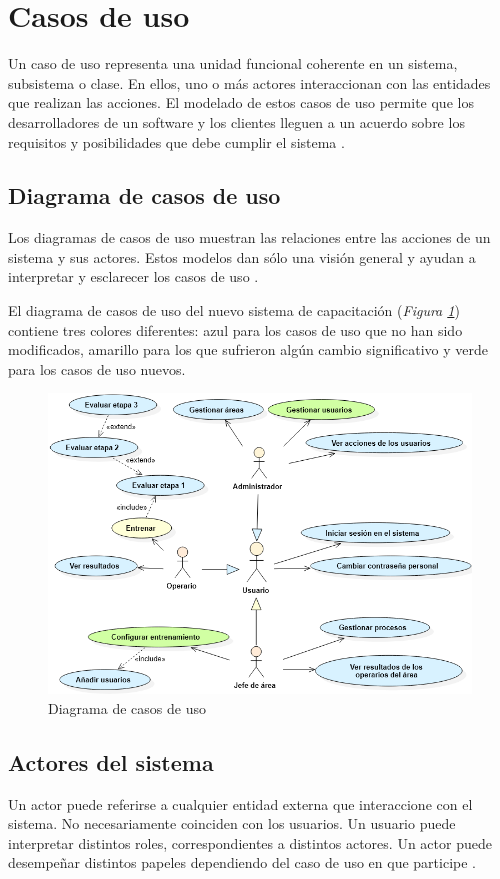 \section{Casos de uso}
Un caso de uso representa una unidad funcional coherente en un sistema, subsistema o clase. En ellos, uno o más actores interaccionan con las entidades que realizan las acciones. El modelado de estos casos de uso permite que los desarrolladores de un software y los clientes lleguen a un acuerdo sobre los requisitos y posibilidades que debe cumplir el sistema \cite{Kalaivani2004}.

\subsection{Diagrama de casos de uso}
Los diagramas de casos de uso muestran las relaciones entre las acciones de un sistema y sus actores. Estos modelos dan sólo una visión general y ayudan a interpretar y esclarecer los casos de uso \cite{Kalaivani2004}.

El diagrama de casos de uso del nuevo sistema de capacitación (\textsl{Figura \ref{fig:dcu}}) contiene tres colores diferentes: azul para los casos de uso que no han sido modificados, amarillo para los que sufrieron algún cambio significativo y verde para los casos de uso nuevos.

\begin{figure}[H]
\centering
 \includegraphics[width=0.65\linewidth]{imagen/dcu.png}
 \caption{Diagrama de casos de uso}
 \label{fig:dcu} 
\end{figure}

\subsection{Actores del sistema} 
Un actor puede referirse a cualquier entidad externa que interaccione con el sistema. No necesariamente coinciden con los usuarios. Un usuario puede interpretar distintos roles, correspondientes a distintos actores. Un actor puede desempeñar distintos papeles dependiendo del caso de uso en que participe \cite{Kalaivani2004}.

